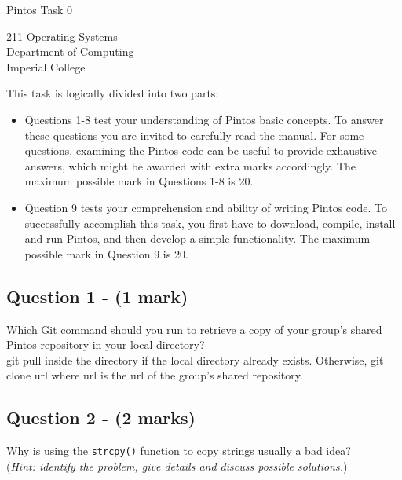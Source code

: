 \documentclass[a4paper,12pt]{article}
\begin{document}
\small

\begin{center}
\begin{LARGE}
Pintos Task 0
\end{LARGE}
\end{center}

\begin{center}
211 Operating Systems \\
Department of Computing \\
Imperial College
\end{center}

This task is logically divided into two parts:
\begin{itemize}
\item Questions 1-8 test your understanding of Pintos basic concepts. 
      To answer these questions you are invited to carefully read the manual. 
      For some questions, examining the Pintos code can be useful to provide exhaustive answers, which might be awarded with extra marks accordingly. 
      The maximum possible mark in Questions 1-8 is 20.
      
\item Question 9 tests your comprehension and ability of writing Pintos code. 
      To successfully accomplish this task, you first have to download, compile, install and run Pintos, and then develop a simple functionality. 
      The maximum possible mark in Question 9 is 20. 
\end{itemize}

\subsection*{Question 1 - (1 mark)}
Which Git command should you run to retrieve a copy of your group’s shared Pintos repository in your local directory?\\

git pull inside the directory if the local directory already exists. Otherwise, git clone url where url is the url of the group's shared repository.

\subsection*{Question 2 - (2 marks)}
Why is using the \texttt{strcpy()} function to copy strings usually a bad idea? \\
(\textit{Hint: identify the problem, give details and discuss possible solutions.})\\
\end{document}
